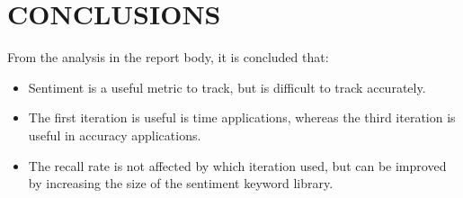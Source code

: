 \section{CONCLUSIONS} %
\label{sec:conclusions}
From the analysis in the report body, it is concluded that:\\

\begin{itemize}
	\item Sentiment is a useful metric to track, but is difficult to track accurately.
	
	\item The first iteration is useful is time applications, whereas the third iteration is useful in accuracy applications.
	
	\item The recall rate is not affected by which iteration used, but can be improved by increasing the size of the sentiment keyword library.
\end{itemize}
